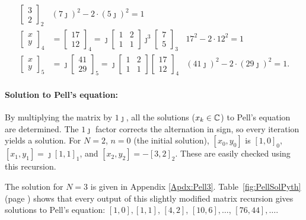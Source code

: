 \documentclass{ximera}
\begin{document}
\begin{align*}
\begin{bmatrix}
3\\2
\end{bmatrix}_2
& (7\jmath)^2 -2\cdot(5\jmath)^2 = 1
\\
\begin{bmatrix}
x \\ y
\end{bmatrix}_4
&=
\begin{bmatrix}
17\\12
\end{bmatrix}_4
 =
\jmath
\begin{bmatrix}
1 & 2 \\
1 & 1
\end{bmatrix}
\jmath^3
\begin{bmatrix}
7\\5
\end{bmatrix}_3
&  17^2 -2\cdot{12}^2 = 1
\\
\begin{bmatrix}
x \\ y
\end{bmatrix}_5
&=
\jmath
\begin{bmatrix}
41\\29
\end{bmatrix}_5
 =
\jmath
\begin{bmatrix}
1 & 2 \\
1 & 1
\end{bmatrix}
\begin{bmatrix}
17 \\ 12
\end{bmatrix}_4
&  {(41\jmath)}^2 -2\cdot{(29\jmath)}^2 = 1.
	\end{align*}
 

\paragraph{Solution to Pell's equation:}
By multiplying the matrix by $1\jmath$, all the solutions ($\boldmath{x}_k\in\mathbb{C}$) to Pell's equation are determined.
The $1\jmath$ factor corrects the alternation in sign, so every iteration yields a solution. 
For $N=2$, $n=0$ (the initial solution),
$[x_0,y_0]$ is $[1,0]_0$, $[x_1,y_1] = \jmath[1,1]_1$, and
$[x_2,y_2]=-[3,2]_2$.  These are easily checked using this recursion.

The solution for $N=3$ is given in Appendix \ref{Apdx:Pell3}. Table~\ref{fig:PellSolPyth}
(page \pageref{fig:PellSolPyth}) shows that every output of this slightly modified matrix recursion gives solutions to Pell's
equation: $[1,0], [1,1]$, $[4,2]$, $[10,6], \dots$, $[76,44], \dots $.
\end{document}
